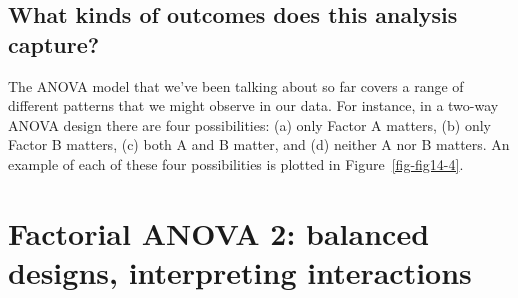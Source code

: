 \documentclass[
  a4paper,
]{book}
\begin{document}
\hypertarget{what-kinds-of-outcomes-does-this-analysis-capture}{%
\subsection{What kinds of outcomes does this analysis
capture?}\label{what-kinds-of-outcomes-does-this-analysis-capture}}

The ANOVA model that we've been talking about so far covers a range of
different patterns that we might observe in our data. For instance, in a
two-way ANOVA design there are four possibilities: (a) only Factor A
matters, (b) only Factor B matters, (c) both A and B matter, and (d)
neither A nor B matters. An example of each of these four possibilities
is plotted in Figure~\ref{fig-fig14-4}.

\hypertarget{factorial-anova-2-balanced-designs-interpreting-interactions}{%
\section{Factorial ANOVA 2: balanced designs, interpreting
interactions}\label{factorial-anova-2-balanced-designs-interpreting-interactions}}
\end{document}
